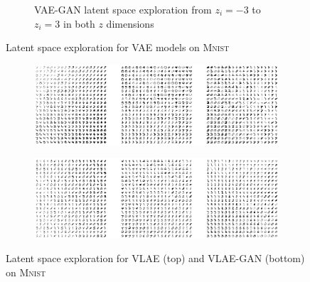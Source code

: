 \documentclass{beamer}
\begin{document}
\begin{frame}
\begin{figure}
\begin{subfigure}{.45\textwidth}
\caption{VAE-GAN latent space exploration from $z_i=-3$ to $z_i=3$ in both $z$ dimensions}
\end{subfigure}
\caption{Latent space exploration for VAE models on \textsc{Mnist}}
\end{figure}
\end{frame}
\begin{frame}
\begin{figure}
\centering
\begin{subfigure}{\textwidth}
\centering
\includegraphics[width=\textwidth]{images/latent_space_traversals/vlae_mnist.png}
\end{subfigure}
\begin{subfigure}{\textwidth}
\centering
\includegraphics[width=\textwidth]{images/latent_space_traversals/vlae_gan_mnist.png}
\end{subfigure}
\caption{Latent space exploration for VLAE (top) and VLAE-GAN (bottom) on \textsc{Mnist}}
\end{figure}
\end{frame}
\end{document}
